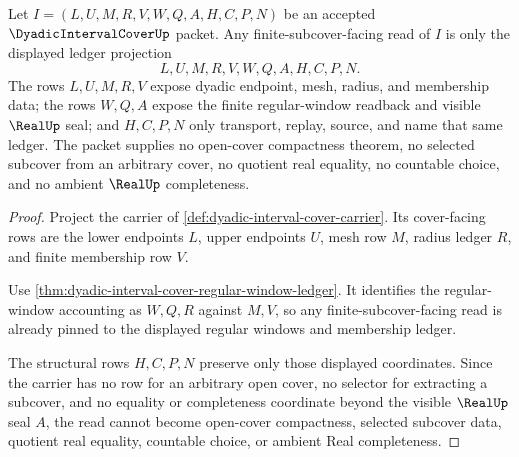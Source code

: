 \begin{theorem}
\label{thm:dyadic-interval-cover-finite-subcover-ledger}
Let $I=(L,U,M,R,V,W,Q,A,H,C,P,N)$ be an accepted $\DyadicIntervalCoverUp$ packet. Any finite-subcover-facing read of $I$ is only the displayed ledger projection
$$
L,U,M,R,V,W,Q,A,H,C,P,N .
$$
The rows $L,U,M,R,V$ expose dyadic endpoint, mesh, radius, and membership data; the rows $W,Q,A$ expose the finite regular-window readback and visible $\RealUp$ seal; and $H,C,P,N$ only transport, replay, source, and name that same ledger. The packet supplies no open-cover compactness theorem, no selected subcover from an arbitrary cover, no quotient real equality, no countable choice, and no ambient $\RealUp$ completeness.
\end{theorem}
\begin{proof}
Project the carrier of \autoref{def:dyadic-interval-cover-carrier}. Its cover-facing rows are the lower endpoints $L$, upper endpoints $U$, mesh row $M$, radius ledger $R$, and finite membership row $V$.

Use \autoref{thm:dyadic-interval-cover-regular-window-ledger}. It identifies the regular-window accounting as $W,Q,R$ against $M,V$, so any finite-subcover-facing read is already pinned to the displayed regular windows and membership ledger.

The structural rows $H,C,P,N$ preserve only those displayed coordinates. Since the carrier has no row for an arbitrary open cover, no selector for extracting a subcover, and no equality or completeness coordinate beyond the visible $\RealUp$ seal $A$, the read cannot become open-cover compactness, selected subcover data, quotient real equality, countable choice, or ambient Real completeness.
\end{proof}

